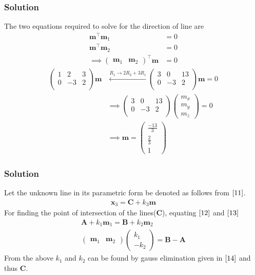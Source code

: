 \documentclass{beamer}
\theoremstyle{remark}
\newcommand{\myvec}[1]{\ensuremath{\begin{pmatrix}#1\end{pmatrix}}}
\let\vec\mathbf
\begin{document}
\begin{frame}
\frametitle{Solution}
The two equations required to solve for the direction of line are 
\begin{align}
\vec{m}^\top\vec{m}_1 &= 0\\
\vec{m}^\top\vec{m}_2 &= 0\\
	\implies \myvec{\vec{m}_1 &\vec{m}_2}^{\top}\vec{m} &= 0
\end{align}
\begin{align}
    \myvec{
        1 & 2 & 3\\
        0 & -3 & 2   \\
    }\vec{m} &\xleftarrow{R_1 \to 2R_2 + 3R_1} \myvec{
        3 & 0 & 13\\
        0 & -3 & 2   \\
    }\vec{m} = 0\\
  &\implies  \myvec{
        3 & 0 & 13\\
        0 & -3 & 2   \\
    }\myvec{
        m_x\\
        m_y\\
        m_z
    } = 0\\
    &\implies \vec{m} = \myvec{
        \frac{-13}{3}\\
        \frac{2}{3}\\
        1
    }
\end{align}
\end{frame}









\begin{frame}
\frametitle{Solution}
Let the unknown line in its parametric form be denoted as follows from $\eqref{11}$.
\begin{align}
    \vec{x}_3 = \vec{C} + k_3\vec{m}
\end{align}
For finding the point of intersection of the lines($\vec{C}$), equating $\eqref{12}$ and $\eqref{13}$
\begin{align}
    \vec{A} + k_1\vec{m}_1 = \vec{B} + k_2\vec{m}_2\\
    \myvec{
        \vec{m}_1 & \vec{m}_2
    }\myvec{
        k_1 \\
        -k_2
    } = \vec{B}-\vec{A}
\end{align}
From the above $k_1$ and $k_2$ can be found by gauss elimination given in $\eqref{14}$ and thus $\vec{C}$.

\end{frame}
\end{document}

